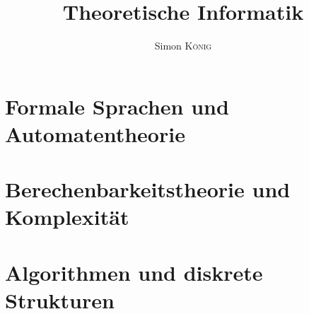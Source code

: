 \documentclass[orange, ngerman]{../LaTeX-Templates/Skript/skript}
\title{Theoretische Informatik\\\subtitleformat{Kurzzusammenfassung zur theoretischen Informatik}}
\author{Simon \textsc{König}}
\begin{document}
\maketitle
\tableofcontents





\renewcommand{\prtname}{Theoretische Informatik}

\part{Formale Sprachen und Automatentheorie}
	
	
	
	
	
	



\part{Berechenbarkeitstheorie und Komplexität}
	
	
	
	
	

\part{Algorithmen und diskrete Strukturen}
	
	
\end{document}

